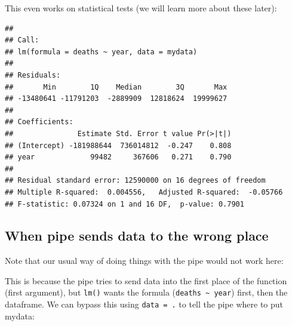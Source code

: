 \documentclass[]{book}
\makeatletter
\newenvironment{Shaded}{\begin{snugshade}}{\end{snugshade}}
\newcommand{\KeywordTok}[1]{\textcolor[rgb]{0.13,0.29,0.53}{\textbf{#1}}}
\newcommand{\DataTypeTok}[1]{\textcolor[rgb]{0.13,0.29,0.53}{#1}}
\newcommand{\StringTok}[1]{\textcolor[rgb]{0.31,0.60,0.02}{#1}}
\newcommand{\CommentTok}[1]{\textcolor[rgb]{0.56,0.35,0.01}{\textit{#1}}}
\newcommand{\OperatorTok}[1]{\textcolor[rgb]{0.81,0.36,0.00}{\textbf{#1}}}
\newcommand{\NormalTok}[1]{#1}
\newenvironment{kframe}{%
\medskip{}
\setlength{\fboxsep}{.8em}
 \def\at@end@of@kframe{}%
 \ifinner\ifhmode%
  \def\at@end@of@kframe{\end{minipage}}%
  \begin{minipage}{\columnwidth}%
 \fi\fi%
 \def\FrameCommand##1{\hskip\@totalleftmargin \hskip-\fboxsep
 \colorbox{shadecolor}{##1}\hskip-\fboxsep
     \hskip-\linewidth \hskip-\@totalleftmargin \hskip\columnwidth}%
 \MakeFramed {\advance\hsize-\width
   \@totalleftmargin\z@ \linewidth\hsize
   \@setminipage}}%
 {\par\unskip\endMakeFramed%
 \at@end@of@kframe}
\renewenvironment{Shaded}{\begin{kframe}}{\end{kframe}}
\makeatother
\begin{document}
This even works on statistical tests (we will learn more about these
later):

\begin{Shaded}
\end{Shaded}

\begin{verbatim}
## 
## Call:
## lm(formula = deaths ~ year, data = mydata)
## 
## Residuals:
##       Min        1Q    Median        3Q       Max 
## -13480641 -11791203  -2889909  12818624  19999627 
## 
## Coefficients:
##               Estimate Std. Error t value Pr(>|t|)
## (Intercept) -181988644  736014812  -0.247    0.808
## year             99482     367606   0.271    0.790
## 
## Residual standard error: 12590000 on 16 degrees of freedom
## Multiple R-squared:  0.004556,   Adjusted R-squared:  -0.05766 
## F-statistic: 0.07324 on 1 and 16 DF,  p-value: 0.7901
\end{verbatim}

\subsection{When pipe sends data to the wrong
place}\label{when-pipe-sends-data-to-the-wrong-place}

Note that our usual way of doing things with the pipe would not work
here:

\begin{Shaded}
\end{Shaded}

This is because the pipe tries to send data into the first place of the
function (first argument), but \texttt{lm()} wants the formula
(\texttt{deaths\ \textasciitilde{}\ year}) first, then the dataframe. We
can bypass this using \texttt{data\ =\ .} to tell the pipe where to put
mydata:

\begin{Shaded}
\end{Shaded}
\end{document}
